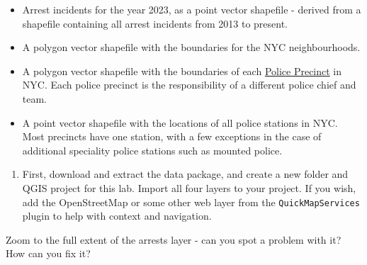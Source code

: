 \documentclass[
  letterpaper,
  DIV=11,
  numbers=noendperiod]{scrreprt}
\providecommand{\tightlist}{%
  \setlength{\itemsep}{0pt}\setlength{\parskip}{0pt}}\usepackage{longtable,booktabs,array}
\begin{document}
\begin{itemize}
\item
  Arrest incidents for the year 2023, as a point vector shapefile -
  derived from a shapefile containing all arrest incidents from 2013 to
  present.
\item
  A polygon vector shapefile with the boundaries for the NYC
  neighbourhoods.
\item
  A polygon vector shapefile with the boundaries of each
  \href{https://www.nyc.gov/site/nypd/bureaus/patrol/find-your-precinct.page}{Police
  Precinct} in NYC. Each police precinct is the responsibility of a
  different police chief and team.
\item
  A point vector shapefile with the locations of all police stations in
  NYC. Most precincts have one station, with a few exceptions in the
  case of additional speciality police stations such as mounted police.
\end{itemize}

\begin{enumerate}
\def\labelenumi{(\arabic{enumi})}
\setcounter{enumi}{329}
\tightlist
\item
  First, download and extract the data package, and create a new folder
  and QGIS project for this lab. Import all four layers to your project.
  If you wish, add the OpenStreetMap or some other web layer from the
  \texttt{QuickMapServices} plugin to help with context and navigation.
\end{enumerate}

\begin{tcolorbox}[enhanced jigsaw, coltitle=black, toprule=.15mm, breakable, opacitybacktitle=0.6, left=2mm, colback=white, leftrule=.75mm, rightrule=.15mm, colbacktitle=quarto-callout-important-color!10!white, toptitle=1mm, titlerule=0mm, colframe=quarto-callout-important-color-frame, arc=.35mm, bottomtitle=1mm, opacityback=0, bottomrule=.15mm, title=\textcolor{quarto-callout-important-color}{\faExclamation}\hspace{0.5em}{Stop and Think}]

Zoom to the full extent of the arrests layer - can you spot a problem
with it? How can you fix it?

\end{tcolorbox}
\end{document}
